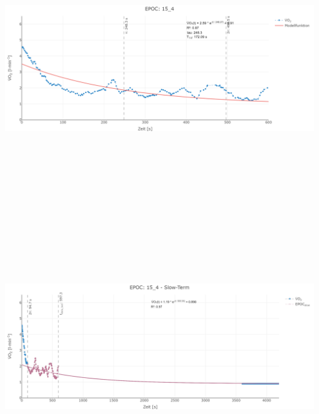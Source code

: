 \documentclass[
  letterpaper,
  DIV=11]{scrartcl}
\begin{document}
\includegraphics[width=11.45833in,height=4.6875in]{images/15_4_tau.png}
\includegraphics[width=11.45833in,height=4.6875in]{images/15_4_slow.png}
\end{document}
